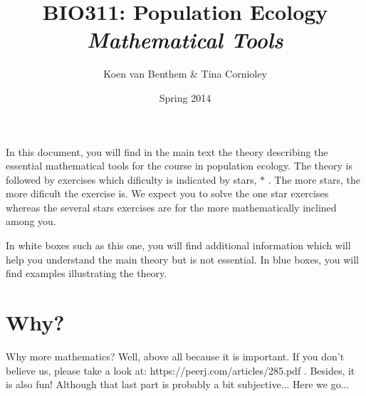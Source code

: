 \documentclass[a4paper]{report}
\title{BIO311: Population Ecology\\\textit{Mathematical Tools}}
\author{Koen van Benthem \& Tina Cornioley}
\date{Spring 2014}
\begin{document}
\maketitle
\tableofcontents
\begin{mdframed}
In this document, you will find in the main text the theory describing the essential mathematical tools for the course in population ecology. The theory is followed by exercises which dificulty is indicated by stars, $\ast$ . The more stars, the more dificult the exercise is. We expect you to solve the one star exercises whereas the several stars exercises are for the more mathematically inclined among you.

In white boxes such as this one, you will find additional information which will help you understand the main theory but is not essential. In blue boxes, you will find examples illustrating the theory.
\end{mdframed}
\newpage
\section{Why?}
Why more mathematics? Well, above all because it is important. If you don't believe us, please take a look at: https://peerj.com/articles/285.pdf . Besides, it is also fun! Although that last part is probably a bit subjective... Here we go...
\end{document}
